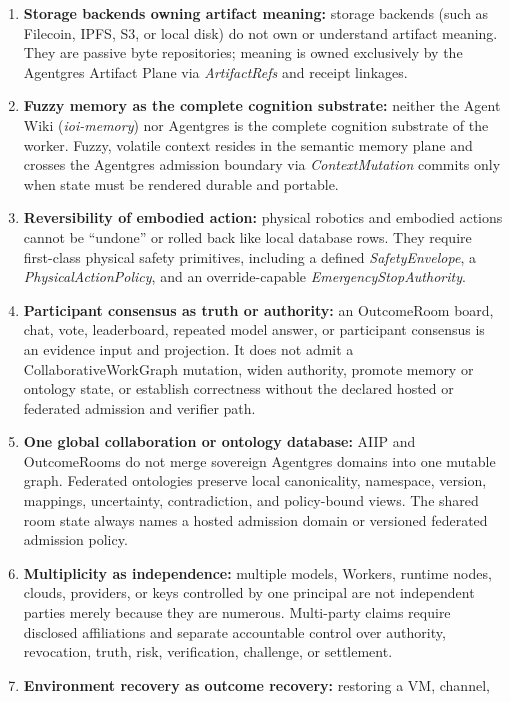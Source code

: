 \documentclass[
  11pt,
]{article}
\begin{document}
\begin{enumerate}
  memory during execution, its state is compromised on a hostile-root
  machine.
\item
  \textbf{Storage backends owning artifact meaning:} storage backends
  (such as Filecoin, IPFS, S3, or local disk) do not own or understand
  artifact meaning. They are passive byte repositories; meaning is owned
  exclusively by the Agentgres Artifact Plane via \emph{ArtifactRefs}
  and receipt linkages.
\item
  \textbf{Fuzzy memory as the complete cognition substrate:} neither the
  Agent Wiki (\emph{ioi-memory}) nor Agentgres is the complete cognition
  substrate of the worker. Fuzzy, volatile context resides in the
  semantic memory plane and crosses the Agentgres admission boundary via
  \emph{ContextMutation} commits only when state must be rendered
  durable and portable.
\item
  \textbf{Reversibility of embodied action:} physical robotics and
  embodied actions cannot be ``undone'' or rolled back like local
  database rows. They require first-class physical safety primitives,
  including a defined \emph{SafetyEnvelope}, a
  \emph{PhysicalActionPolicy}, and an override-capable
  \emph{EmergencyStopAuthority}.
\item
  \textbf{Participant consensus as truth or authority:} an OutcomeRoom board,
  chat, vote, leaderboard, repeated model answer, or participant consensus is
  an evidence input and projection. It does not admit a CollaborativeWorkGraph
  mutation, widen authority, promote memory or ontology state, or establish
  correctness without the declared hosted or federated admission and verifier
  path.
\item
  \textbf{One global collaboration or ontology database:} AIIP and
  OutcomeRooms do not merge sovereign Agentgres domains into one mutable graph.
  Federated ontologies preserve local canonicality, namespace, version,
  mappings, uncertainty, contradiction, and policy-bound views. The shared
  room state always names a hosted admission domain or versioned federated
  admission policy.
\item
  \textbf{Multiplicity as independence:} multiple models, Workers, runtime
  nodes, clouds, providers, or keys controlled by one principal are not
  independent parties merely because they are numerous. Multi-party claims
  require disclosed affiliations and separate accountable control over
  authority, revocation, truth, risk, verification, challenge, or settlement.
\item
  \textbf{Environment recovery as outcome recovery:} restoring a VM, channel,

\end{enumerate}
\end{document}
